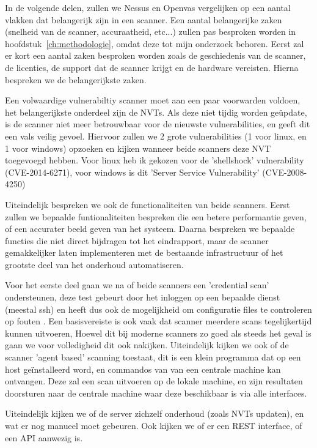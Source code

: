 In de volgende delen, zullen we Nessus en Openvas vergelijken op een aantal vlakken dat belangerijk zijn in een scanner. Een aantal belangerijke zaken (snelheid van de scanner, accuraatheid, etc...) zullen pas besproken worden in hoofdstuk~\ref{ch:methodologie}, omdat deze tot mijn onderzoek behoren. Eerst zal er kort een aantal zaken besproken worden zoals de geschiedenis van de scanner, de licenties, de support dat de scanner krijgt en de hardware vereisten. Hierna bespreken we de belangerijkste zaken.

Een volwaardige vulnerabiltiy scanner moet aan een paar voorwarden voldoen, het belangerijkste onderdeel zijn de NVTs. Als deze niet tijdig worden geüpdate, is de scanner niet meer betrouwbaar voor de nieuwste vulnerabilities, en geeft dit een vals veilig gevoel. Hiervoor zullen we 2 grote vulnerabilities (1 voor linux, en 1 voor windows) opzoeken en kijken wanneer beide scanners deze NVT toegevoegd hebben. Voor linux heb ik gekozen voor de 'shellshock' vulnerability (CVE-2014-6271), voor windows is dit 'Server Service Vulnerability' (CVE-2008-4250)

Uiteindelijk bespreken we ook de functionaliteiten van beide scanners. Eerst zullen we bepaalde funtionaliteiten bespreken die een betere performantie geven, of een accurater beeld geven van het systeem. Daarna bespreken we bepaalde functies die niet direct bijdragen tot het eindrapport, maar de scanner gemakkelijker laten implementeren met de bestaande infrastructuur of het grootste deel van het onderhoud automatiseren. 

Voor het eerste deel gaan we na of beide scanners een 'credential scan' ondersteunen, deze test gebeurt door het inloggen op een bepaalde dienst (meestal ssh) en heeft dus ook de mogelijkheid om configuratie files te controleren op fouten \textcite{Digitalbond}. Een basisvereiste is ook vaak dat scanner meerdere scans tegelijkertijd kunnen uitvoeren, Hoewel dit bij moderne scanners zo goed als steeds het geval is gaan we voor volledigheid dit ook nakijken. Uiteindelijk kijken we ook of de scanner 'agent based' scanning toestaat, dit is een klein programma dat op een host geïnstalleerd word, en commandos van van een centrale machine kan ontvangen. Deze zal een scan uitvoeren op de lokale machine, en zijn resultaten doorsturen naar de centrale machine waar deze beschikbaar is via alle interfaces.

Uiteindelijk kijken we of  de server zichzelf onderhoud (zoals NVTs updaten), en wat er nog manueel moet gebeuren. Ook kijken we of er een REST interface, of een API aanwezig is. 

